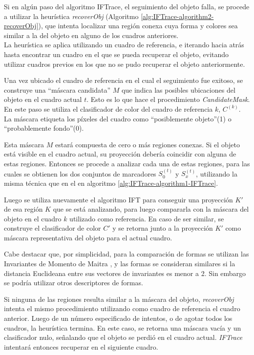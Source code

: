 \documentclass[a4paper,10pt]{article}
\begin{document}
Si en algún paso del algoritmo IFTrace, el seguimiento del objeto falla, se 
procede a utilizar la heurística \textit{recoverObj} (Algoritmo \ref{alg:IFTrace-algorithm2-recoverObj}), que intenta localizar una
región conexa cuya forma y colores sea similar a la del objeto en alguno de los 
cuadros anteriores.\\

La heurística se aplica utilizando un cuadro de referencia, e iterando hacia atrás
hasta encontrar un cuadro en el que se pueda recuperar el objeto, evitando 
utilizar cuadros previos en los que no se pudo recuperar el objeto anteriormente.

Una vez ubicado el cuadro de referencia en el cual el seguimiento fue exitoso, 
se construye una ``máscara candidata'' $M$ que indica las posibles ubicaciones
del objeto en el cuadro actual $t$. Esto es lo que hace el procedimiento \textit{CandidateMask}. 
En este paso se 
utiliza el clasificador de color del cuadro de referencia $k$, $C^{(k)}$. La máscara 
etiqueta los píxeles del cuadro como ``posiblemente objeto''(1) o 
``probablemente fondo''(0). 

Esta máscara $M$ estará compuesta de cero
o más regiones conexas. Si el objeto está visible en el cuadro actual, 
su proyección debería coincidir con alguna de estas regiones. Entonces 
se procede a analizar cada una de estas regiones, para las cuales se obtienen
los dos conjuntos de marcadores $S_{0}^{(t)}$ y $S_{x}^{(t)}$, utilizando la misma técnica que en el
en algoritmo \ref{alg:IFTrace-algorithm1-IFTrace}.

 Luego se utiliza 
nuevamente el algoritmo IFT para conseguir una proyección $K'$ de esa región $K$ que 
se está analizando, para luego compararla con la máscara del objeto en el cuadro
$k$ utilizado como referencia. En caso de ser similar, se construye el clasificador
de color $C'$ y se retorna junto a la proyección $K'$ como máscara representativa 
del objeto para el actual cuadro. 

Cabe destacar que, por simplicidad, para la comparación de formas se utilizan
las Invariantes de Momento de Maitra \cite{MaitraMomentInvariants}, y las formas se consideran similares
si la distancia Euclideana entre sus vectores de invariantes es menor a 2. 
Sin embargo se podría utilizar otros descriptores de formas.

Si ninguna de las regiones resulta similar a la máscara del objeto, 
\textit{recoverObj} intenta el mismo procedimiento utilizando como cuadro de 
referencia el cuadro anterior. Luego de un número especificado de intentos, o
de agotar todos los cuadros, la heurística termina. En este caso, se retorna
una máscara vacía y un clasificador nulo, señalando que el objeto se perdió en
el cuadro actual. \textit{IFTrace} intentará entonces recuperar en el siguiente 
cuadro.
\end{document}
